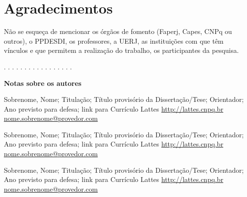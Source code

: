 \documentclass[a4paper,11pt,oneside,onecolumn,final]{article}
\begin{document}
\lipsum[1-3]


\section*{Agradecimentos}

Não se esqueça de mencionar os órgãos de fomento (Faperj, Capes, CNPq ou outros), o PPDESDI, os professores, a UERJ, as instituições com que têm vínculos e que permitem a realização do trabalho, os participantes da pesquisa.






.  .  .  .  .  .  .  .  .  .  .  .  .  .  .  .  . 

\textbf{Notas sobre os autores}

Sobrenome, Nome; Titulação; Título provisório da Dissertação/Tese; Orientador; Ano previsto para defesa; link para Currículo Lattes 
\url{http://lattes.cnpq.br}
\url{nome.sobrenome@provedor.com}

\vspace{5mm} %

Sobrenome, Nome; Titulação; Título provisório da Dissertação/Tese; Orientador; Ano previsto para defesa; link para Currículo Lattes 
\url{http://lattes.cnpq.br}
\url{nome.sobrenome@provedor.com}

\vspace{5mm} %

Sobrenome, Nome; Titulação; Título provisório da Dissertação/Tese; Orientador; Ano previsto para defesa; link para Currículo Lattes 
\url{http://lattes.cnpq.br}
\url{nome.sobrenome@provedor.com}
\end{document}
